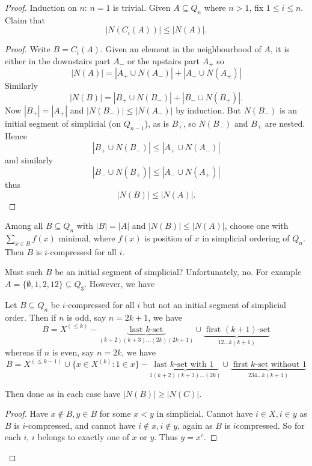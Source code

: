 \documentclass[a4paper]{article}
\begin{document}
\begin{proof}
  Induction on \(n\): \(n = 1\) is trivial. Given \(A \subseteq Q_n\) where \(n > 1\), fix \(1 \leq i \leq n\). Claim that
  \[
    |N(C_i(A))| \leq |N(A)|.
  \]
  \begin{proof}
    Write \(B = C_i(A)\). Given an element in the neighbourhood of \(A\), it is either in the downstairs part \(A_-\) or the upstairs part \(A_+\) so
    \[
      |N(A)| = |A_+ \cup N(A_-)| + |A_- \cup N(A_+)|
    \]
    Similarly
    \[
      |N(B)| = |B_+ \cup N(B_-)| + |B_- \cup N(B_+)|.
    \]
    Now \(|B_+| = |A_+|\) and \(|N(B_-)| \leq |N(A_-)|\) by induction. But \(N(B_-)\)  is an initial segment of simplicial (on \(Q_{n - 1}\)), as is \(B_+\), so \(N(B_-)\) and \(B_+\) are nested. Hence
    \[
      |B_+ \cup N(B_-)| \leq |A_+ \cup N(A_-)|
    \]
    and similarly
    \[
      |B_- \cup N(B_+)| \leq |A_- \cup N(A_+)|
    \]
    thus
    \[
      |N(B)| \leq |N(A)|.
    \]
  \end{proof}

  Among all \(B \subseteq Q_n\) with \(|B| = |A|\) and \(|N(B)| \leq |N(A)|\), choose one with \(\sum_{x \in B} f(x)\) minimal, where \(f(x)\) is position of \(x\) in simplicial ordering of \(Q_n\). Then \(B\) is \(i\)-compressed for all \(i\).

  Must such \(B\) be an initial segment of simplicial? Unfortunately, no. For example \(A = \{\emptyset, 1, 2, 12\} \subseteq Q_3\). However, we have

  \begin{lemma}
    Let \(B \subseteq Q_n\) be \(i\)-compressed for all \(i\) but not an initial segment of simplicial order. Then if \(n\) is odd, say \(n = 2k + 1\), we have
    \[
      B = X^{(\leq k)} - \underbrace{\text{ last \(k\)-set }}_{(k + 2)(k + 3) \dots (2k)(2k + 1)} \cup \underbrace{\text{ first \((k + 1)\)-set}}_{12\dots k(k + 1)}
    \]
    whereas if \(n\) is even, say \(n = 2k\), we have
    \[
      B = X^{(\leq k - 1)} \cup \{x \in X^{(k)}: 1 \in x\} - \underbrace{\text{ last \(k\)-set with \(1\) }}_{1(k + 2)(k + 3) \dots (2k)} \cup \underbrace{\text{ first \(k\)-set without \(1\)}}_{234\dots k (k + 1)}
    \]
  \end{lemma}
  Then done as in each case have \(|N(B)| \geq |N(C)|\).

  \begin{proof}
    Have \(x \notin B, y \in B\) for some \(x < y\) in simplicial. Cannot have \(i \in X, i \in y\) as \(B\) is \(i\)-compressed, and cannot have \(i \notin x, i \notin y\), again as \(B\) is \(i\)compressed. So for each \(i\), \(i\) belongs to exactly one of \(x\) or \(y\). Thus \(y = x^c\).


\end{proof}
\end{proof}
\end{document}
